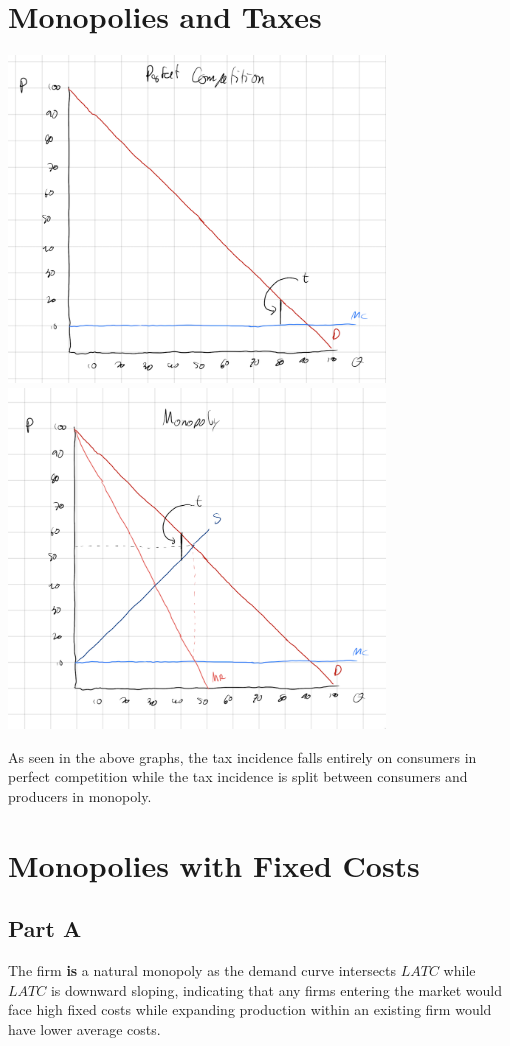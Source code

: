 \documentclass[8pt]{extarticle}
\begin{document}
{\section*{Monopolies and Taxes}
\begin{center}
	\includegraphics[width=10cm]{HW10Q4A}\\
	\includegraphics[width=10cm]{HW10Q4B}
\end{center}
As seen in the above graphs, the tax incidence falls entirely on consumers in perfect competition while the tax incidence is split between consumers and producers in monopoly.
\section*{Monopolies with Fixed Costs}
\subsection*{Part A}
The firm \textbf{is} a natural monopoly as the demand curve intersects $LATC$ while $LATC$ is downward sloping, indicating that any firms entering the market would face high fixed costs while expanding production within an existing firm would have lower average costs.
}
\end{document}
